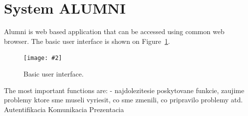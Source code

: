 \documentclass{iitsrc}[2006/14/02]
\newcommand\fig[4]{%
	\begin{figure}[h]
	\begin{center}
	\texttt{[image: \#2]}
	~\\%
	\caption{#4}
	\label{#3}
	\end{center}
	\end{figure}
}
\begin{document}



\section{System ALUMNI}

Alumni is web based application that can be accessed using common web browser. The basic user interface is shown on Figure~\ref{fig:scr1}. 

\fig{width=12cm, bb = 0 0 831 683}{images/screen1.png}{fig:scr1}{Basic user interface.}

The most important functions are:
- najdolezitesie poskytovane funkcie, zaujime problemy ktore sme museli vyriesit, co sme zmenili, co pripravilo problemy atd.
Autentifikacia
Komunikacia
Prezentacia
\end{document}
